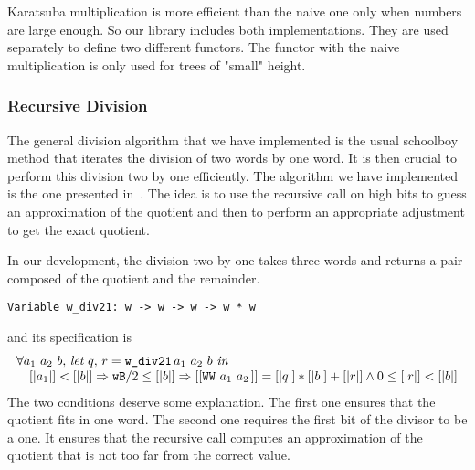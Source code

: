 Karatsuba multiplication is more efficient than the naive one
only when numbers are large enough. So our library
includes both implementations. They are used separately to define two
different functors. The functor with the naive multiplication is only used 
for trees of "small" height. 

\subsubsection{Recursive Division}
The general division algorithm that we have implemented is the usual schoolboy 
method that iterates the division of two words by one word. 
It is then crucial to perform this division two by one efficiently. 
The algorithm we have implemented is the one presented in~\cite{RecDiv}.
The idea is to use the recursive call on high bits to guess an approximation 
of the quotient and  then to perform an appropriate adjustment to get the exact quotient.

In our development, the division two by one takes
three words and returns a pair composed of the quotient and the remainder.
\begin{verbatim}
Variable w_div21: w -> w -> w -> w * w
\end{verbatim}
and its specification is 
$$\begin{array}{l}
\forall a_1\,\, a_2\,\, b,\, \textit{let}\,\, q,\, r = \texttt{w\_div21}\, a_1\,\, a_2\,\, b\,\, \textit{in}\,\, \\
\hskip10pt [|a_1|] < [|b|] \Rightarrow {\texttt{wB}} / 2 \le [|b|] \Rightarrow  [[\texttt{WW}\,\,a_1\,\,a_2\,]] = [|q|] * [|b|] + [|r|] \land 0 \le [|r|] < [|b|]
\end{array}
$$
The two conditions deserve some explanation.
The first one ensures that the quotient fits in one word.
The second one requires the first bit of the divisor to be a 
one. It ensures that the recursive call computes an approximation 
of the quotient that is not too far from the correct value.

